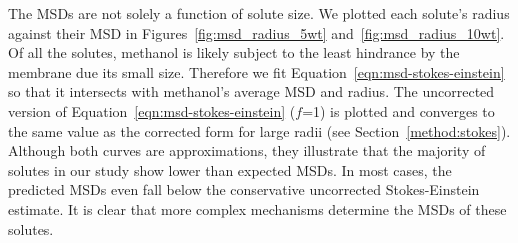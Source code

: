 \documentclass[journal=jpcbfk,manuscript=article]{achemso}
\begin{document}
  The MSDs are not solely a function of solute size. We plotted each solute's radius
  against their MSD in Figures~\ref{fig:msd_radius_5wt} and~\ref{fig:msd_radius_10wt}.
  Of all the solutes, methanol is likely subject to the least hindrance by
  the membrane due its small size. Therefore we fit Equation~\ref{eqn:msd-stokes-einstein}
  so that it intersects with methanol's average MSD and radius. The uncorrected version of 
  Equation~\ref{eqn:msd-stokes-einstein} ($f$=1) is plotted and converges to the same value as the
  corrected form for large radii (see Section~\ref{method:stokes}). Although both curves are 
  approximations, they illustrate that the majority of solutes in our study show
  lower than expected MSDs. In most cases, the predicted MSDs even fall below the 
  conservative uncorrected Stokes-Einstein estimate. It is clear that more complex
  mechanisms determine the MSDs of these solutes.
  
\end{document}
